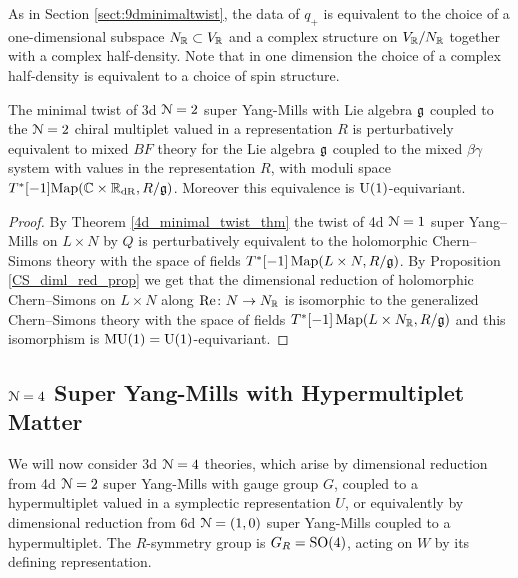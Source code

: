 \documentclass[10pt, oneside]{article}
\newcommand{\MU}{\mathrm{MU}}
\renewcommand{\Re}{\mathrm{Re}}
\begin{document}
As in Section \ref{sect:9dminimaltwist}, the data of $q_+$ is equivalent to the choice of a one-dimensional subspace $N_\mathbb R\subset V_\mathbb R$ and a complex structure on $V_\mathbb R/N_\mathbb R$ together with a complex half-density.  Note that in one dimension the choice of a complex half-density is equivalent to a choice of spin structure.

\begin{theorem} \label{3d_minimal_twist_thm}
The minimal twist of 3d $\mathcal N=2$ super Yang-Mills with Lie algebra $\mathfrak g$ coupled to the $\mathcal N=2$ chiral multiplet valued in a representation $R$ is perturbatively equivalent to mixed $BF$ theory for the Lie algebra $\mathfrak g$ coupled to the mixed $\beta\gamma$ system with values in the representation $R$, with moduli space $T^*[-1]\mathrm{Map}(\mathbb C \times \mathbb R_{\mathrm{dR}}, R/\mathfrak{g})$. Moreover this equivalence is $\mathrm{U}(1)$-equivariant.
\end{theorem}

\begin{proof}
By Theorem \ref{4d_minimal_twist_thm} the twist of 4d $\mathcal N=1$ super Yang--Mills on $L\times N$ by $Q$ is perturbatively equivalent to the holomorphic Chern--Simons theory with the space of fields $T^*[-1]\operatorname{Map}(L\times N, R / \mathfrak g)$. By Proposition \ref{CS_diml_red_prop} we get that the dimensional reduction of holomorphic Chern--Simons on $L\times N$ along $\Re\colon N\rightarrow N_\RR$ is isomorphic to the generalized Chern--Simons theory with the space of fields $T^*[-1]\operatorname{Map}(L\times N_\mathbb R, R/\mathfrak g)$ and this isomorphism is $\MU(1) = \mr U(1)$-equivariant.
\end{proof}

\subsection{\texorpdfstring{$\mathcal N = 4$}{N=4} Super Yang-Mills with Hypermultiplet Matter} \label{3d_4_section}
We will now consider 3d $\mathcal{N}=4$ theories, which arise by dimensional reduction from 4d $\mathcal{N}=2$ super Yang-Mills with gauge group $G$, coupled to a hypermultiplet valued in a symplectic representation $U$, or equivalently by dimensional reduction from 6d $\mathcal{N}=(1,0)$ super Yang-Mills coupled to a hypermultiplet.  The $R$-symmetry group is $G_R = \mathrm{SO}(4)$, acting on $W$ by its defining representation.
\end{document}
